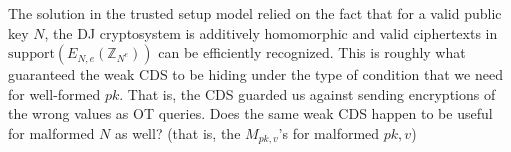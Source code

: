 \documentclass[11pt]{article}
\newcommand{\encr}[2]{E_{#1}(#2)}
\newcommand{\encdj}{{E}_{N,e}}
\newcommand{\support}{{\mathrm{support}}}
\newcommand{\plain}{{{M}}}
\newcommand{\plaintext}[1]{\plain_{#1}}
\newcommand{\fnrngdom}[2]{#1\to#2}
\newcommand{\fndef}[3]{{#1\,:\,\fnrngdom{#2}{#3}}}
\newcommand{\Z}{{\mathbb{Z}}}
\newcommand{\usamp}[2]{#1\stackrel{R}{\leftarrow}#2}
\newcommand{\U}[1]{\mathbb{Z}_{#1}^*}
\begin{document}
The solution in the trusted setup model relied on the fact that
for a valid public key $N$, the DJ cryptosystem is additively homomorphic and
valid ciphertexts in $\support(\encdj(\Z_{N^e}))$ can be
efficiently recognized. This is roughly what guaranteed the weak CDS to be hiding under the type of condition that we need for well-formed $pk$. That is, the CDS guarded us against sending encryptions of the wrong values as OT queries.
Does the same weak CDS happen to be useful for malformed $N$ as well?
(that is, the $M_{pk,v}$'s for malformed $pk,v$)
\end{document}
